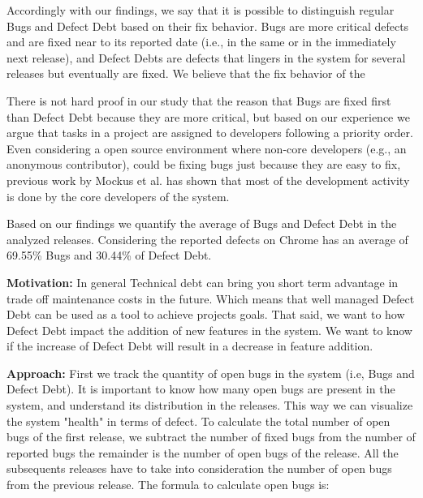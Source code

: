 Accordingly with our findings, we say that it is possible to distinguish regular Bugs and Defect Debt based on their fix behavior. Bugs are more critical defects and are fixed near to its reported date (i.e., in the same or in the immediately next release), and Defect Debts are defects that lingers in the system for several releases but eventually are fixed. We believe that the fix behavior of the 

There is not hard proof in our study that the reason that Bugs are fixed first than Defect Debt because they are more critical, but based on our experience we argue that tasks in a project are assigned to developers following a priority order. Even considering a open source environment where non-core developers (e.g., an anonymous contributor), could be fixing bugs just because they are easy to fix, previous work by Mockus et al. \cite{mockus2010ICSM} has shown that most of the development activity is done by the core developers of the system.

Based on our findings we quantify the average of Bugs and Defect Debt in the analyzed releases. Considering the reported defects on Chrome has an average of 69.55\% Bugs and 30.44\% of Defect Debt.

\vspace{1mm}
\vspace{1mm}

\vspace{3mm}
\noindent\rqii
\vspace{3mm}

\noindent\textbf{Motivation:} In general Technical debt can bring you short term advantage in trade off maintenance costs in the future. Which means that well managed Defect Debt can be used as a tool to achieve projects goals. That said, we want to how Defect Debt impact the addition of new features in the system. We want to know if the increase of Defect Debt will result in a decrease in feature addition. 

\vspace{1mm}
\noindent\textbf{Approach:} First we track the quantity of open bugs in the system (i.e, Bugs and Defect Debt). It is important to know how many open bugs are present in the system, and understand its distribution in the releases. This way we can visualize the system "health" in terms of defect. To calculate the total number of open bugs of the first release, we subtract the number of fixed bugs from the number of reported bugs the remainder is the number of open bugs of the release. All the subsequents releases have to take into consideration the number of open bugs from the previous release. The formula to calculate open bugs is:

